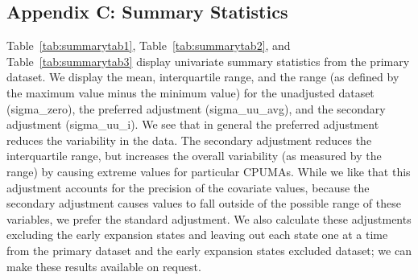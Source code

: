 \documentclass[12pt]{article}
\begin{document}
\subsection{Appendix C: Summary Statistics}

Table~\ref{tab:summarytab1}, Table~\ref{tab:summarytab2}, and Table~\ref{tab:summarytab3} display univariate summary statistics from the primary dataset. We display the mean, interquartile range, and the range (as defined by the maximum value minus the minimum value) for the unadjusted dataset (sigma\_zero), the preferred adjustment (sigma\_uu\_avg), and the secondary adjustment (sigma\_uu\_i). We see that in general the preferred adjustment reduces the variability in the data. The secondary adjustment reduces the interquartile range, but increases the overall variability (as measured by the range) by causing extreme values for particular CPUMAs. While we like that this adjustment accounts for the precision of the covariate values, because the secondary adjustment causes values to fall outside of the possible range of these variables, we prefer the standard adjustment. We also calculate these adjustments excluding the early expansion states and leaving out each state one at a time from the primary dataset and the early expansion states excluded dataset; we can make these results available on request.
\end{document}
